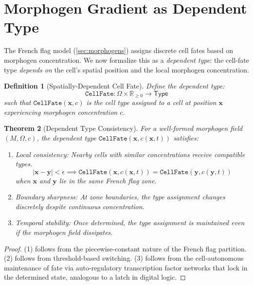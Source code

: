 \documentclass[12pt,a4paper]{article}
\newtheorem{theorem}{Theorem}[section]
\newtheorem{definition}[theorem]{Definition}
\begin{document}
\section{Morphogen Gradient as Dependent Type}\label{sec:morphogen-dependent}

The French flag model (\cref{sec:morphogens}) assigns discrete cell fates
based on morphogen concentration.  We now formalize this as a
\emph{dependent type}: the cell-fate type \emph{depends on} the
cell's spatial position and the local morphogen concentration.

\begin{definition}[Spatially-Dependent Cell Fate]\label{def:dependent-fate}
Define the dependent type:
\[
  \texttt{CellFate} : \Omega \times \mathbb{R}_{\geq 0} \to \mathsf{Type}
\]
such that $\texttt{CellFate}(\mathbf{x}, c)$ is the cell type assigned
to a cell at position $\mathbf{x}$ experiencing morphogen concentration $c$.
\end{definition}

\begin{theorem}[Dependent Type Consistency]\label{thm:dependent-consistency}
For a well-formed morphogen field $(M, \Omega, c)$, the dependent
type $\texttt{CellFate}(\mathbf{x}, c(\mathbf{x},t))$ satisfies:
\begin{enumerate}
  \item \emph{Local consistency}: Nearby cells with similar
    concentrations receive compatible types.
    \[
      |\mathbf{x} - \mathbf{y}| < \epsilon \implies
      \texttt{CellFate}(\mathbf{x}, c(\mathbf{x},t)) =
      \texttt{CellFate}(\mathbf{y}, c(\mathbf{y},t))
    \]
    when $\mathbf{x}$ and $\mathbf{y}$ lie in the same French flag zone.
  \item \emph{Boundary sharpness}: At zone boundaries, the type
    assignment changes discretely despite continuous concentration.
  \item \emph{Temporal stability}: Once determined, the type
    assignment is maintained even if the morphogen field dissipates.
\end{enumerate}
\end{theorem}

\begin{proof}
(1) follows from the piecewise-constant nature of the French flag
partition.  (2) follows from threshold-based switching.  (3) follows
from the cell-autonomous maintenance of fate via auto-regulatory
transcription factor networks that lock in the determined state,
analogous to a latch in digital logic.
\end{proof}
\end{document}
